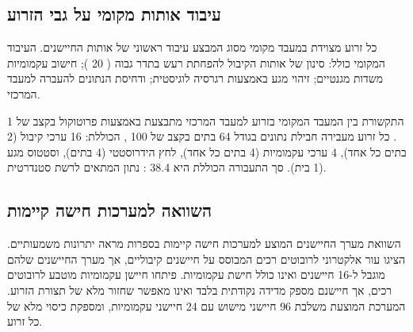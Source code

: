 \begin{table}[htbp]
\centering
\caption{מפרט טכני של חיישני המערכת.}
\label{tab:sensor_specs}
\end{table}

\subsection{עיבוד אותות מקומי על גבי הזרוע}
\label{sec:sensors_processing}

כל זרוע מצוידת במעבד מקומי מסוג  המבצע עיבוד ראשוני של אותות החיישנים. העיבוד המקומי כולל: סינון  של אותות הקיבול להפחתת רעש בתדר גבוה ( 20 ); חישוב עקמומיות משדות מגנטיים; זיהוי מגע באמצעות רגרסיה לוגיסטית; ודחיסת הנתונים להעברה למעבד המרכזי.

התקשורת בין המעבד המקומי בזרוע למעבד המרכזי מתבצעת באמצעות פרוטוקול  בקצב של 1 . כל זרוע מעבירה חבילת נתונים בגודל 64 בתים בקצב של 100 , הכוללת: 16 ערכי קיבול (2 בתים כל אחד), 4 ערכי עקמומיות (4 בתים כל אחד), לחץ הידרוסטטי (4 בתים), וסטטוס מגע (1 בית). סך התעבורה הכוללת היא 38.4  : נתון המתאים לרשת  סטנדרטית.

\subsection{השוואה למערכות חישה קיימות}
\label{sec:sensors_comparison}

השוואת מערך החיישנים המוצע למערכות חישה קיימות בספרות מראה יתרונות משמעותיים. \cite{Shih2020} הציגו עור אלקטרוני לרובוטים רכים המבוסס על חיישנים קיבוליים, אך מערך החיישנים שלהם מוגבל ל-16 חיישנים ואינו כולל חישת עקמומיות. \cite{Ozel2015} פיתחו חיישן עקמומיות מוטבע לרובוטים רכים, אך חיישנם מספק מדידה נקודתית בלבד ואינו מאפשר שחזור מלא של תצורת הזרוע. המערכת המוצעת משלבת 96 חיישני מישוש עם 24 חיישני עקמומיות, ומספקת כיסוי מלא של כל זרוע.

